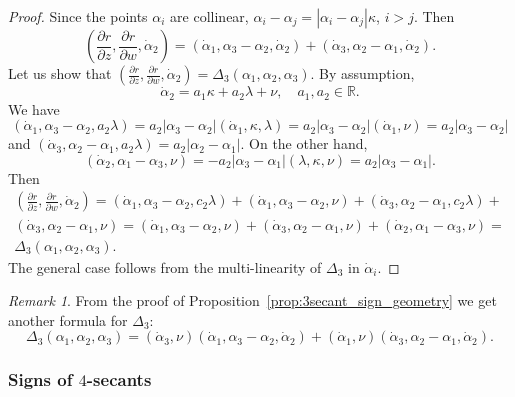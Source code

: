\documentclass{article}
\theoremstyle{definition}
\theoremstyle{remark}
\newtheorem{remark}{Remark}
\def\R{{\mathbb R}}
\begin{document}
\begin{proof}
Since  the points $\alpha_i$ are collinear, $\alpha_i-\alpha_j=|\alpha_i-\alpha_j|\kappa$, $i>j$. Then
\begin{equation*}%
   (\frac{\partial r}{\partial z},\frac{\partial r}{\partial w},\dot\alpha_2)=
   (\dot\alpha_1,\alpha_3-\alpha_2,\dot\alpha_2)+(\dot\alpha_3,\alpha_2-\alpha_1,\dot\alpha_2).
\end{equation*}
Let us show that $(\frac{\partial r}{\partial z},\frac{\partial r}{\partial w},\dot\alpha_2)=\Delta_3(\alpha_1,\alpha_2,\alpha_3)$. By assumption,
\[
\dot\alpha_2=a_1\kappa+a_2\lambda+\nu,\quad a_1,a_2\in\R.
\]
We have
\[
(\dot\alpha_1,\alpha_3-\alpha_2,a_2\lambda)=a_2|\alpha_3-\alpha_2|(\dot\alpha_1,\kappa,\lambda)=a_2|\alpha_3-\alpha_2|(\dot\alpha_1,\nu)=a_2|\alpha_3-\alpha_2|
\]
and $(\dot\alpha_3,\alpha_2-\alpha_1,a_2\lambda)=a_2|\alpha_2-\alpha_1|$. On the other hand,
\[
(\dot\alpha_2,\alpha_1-\alpha_3,\nu)=-a_2|\alpha_3-\alpha_1|(\lambda,\kappa,\nu)=a_2|\alpha_3-\alpha_1|.
\]
Then
\begin{multline*}
    (\frac{\partial r}{\partial z},\frac{\partial r}{\partial w},\dot\alpha_2)=(\dot\alpha_1,\alpha_3-\alpha_2,c_2\lambda)+(\dot\alpha_1,\alpha_3-\alpha_2,\nu)+(\dot\alpha_3,\alpha_2-\alpha_1,c_2\lambda)+\\(\dot\alpha_3,\alpha_2-\alpha_1,\nu)=
    (\dot\alpha_1,\alpha_3-\alpha_2,\nu)+(\dot\alpha_3,\alpha_2-\alpha_1,\nu)+
    (\dot\alpha_2,\alpha_1-\alpha_3,\nu)=\\ \Delta_3(\alpha_1,\alpha_2,\alpha_3).
\end{multline*}
The general case follows from the multi-linearity of $\Delta_3$ in $\dot\alpha_i$.
\end{proof}

\begin{remark}
    From the proof of Proposition~\ref{prop:3secant_sign_geometry} we get another formula for $\Delta_3$:
\begin{equation}
    \Delta_3(\alpha_1,\alpha_2,\alpha_3)=(\dot\alpha_3,\nu)(\dot\alpha_1,\alpha_3-\alpha_2,\dot\alpha_2)+(\dot\alpha_1,\nu)(\dot\alpha_3,\alpha_2-\alpha_1,\dot\alpha_2).
\end{equation}
\end{remark}

\subsubsection{Signs of $4$-secants}
\end{document}
